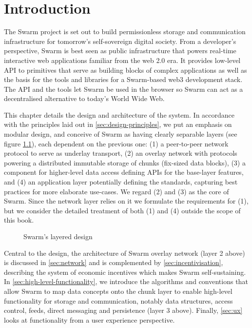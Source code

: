 \chapter{Introduction}

The Swarm project is set out to build permissionless storage and communication infrastructure for tomorrow's self-sovereign digital society.  From a developer's perspective, Swarm is best seen as public infrastructure that powers real-time interactive web applications familiar from the web 2.0 era. It provides low-level API to primitives that serve as building blocks of complex applications as well as the basis for the tools and libraries for a Swarm-based web3 development stack. The API and the tools let Swarm be used in the browser so Swarm can act as a decentralised alternative to today's World Wide Web.

This chapter details the design and architecture of the system. In accordance with the principles laid out in \ref{sec:design-principles}, we put an emphasis on modular design, and conceive of Swarm as having clearly separable layers (see figure \ref{fig:Swarm-layered-design}), each dependent on the previous one: (1) a peer-to-peer network protocol to serve as underlay transport, (2) an overlay network with protocols powering a distributed immutable storage of chunks (fix-sized data blocks),  (3) a component for higher-level data access defining APIs for the base-layer features, and (4) an application layer potentially defining the standards, capturing best practices for more elaborate use-cases. We regard (2) and (3) as the core of Swarm. Since the network layer relies on it we formulate the requirements for (1), but we consider the detailed treatment of both (1) and (4) outside the scope of this book.


\begin{figure}[htbp]
  \centering
  \caption[Swarm's layered design]{Swarm's layered design}
  \label{fig:Swarm-layered-design}
\end{figure}

Central to the design, the architecture of Swarm overlay network (layer 2 above) is discussed in \ref{sec:network} and is complemented by \ref{sec:incentivisation}, describing the system of economic incentives which makes Swarm self-sustaining. In \ref{sec:high-level-functionality}, we introduce the algorithms and conventions that allow Swarm to map data concepts onto the chunk layer to enable high-level functionality for storage and communication, notably data structures, access control, feeds, direct messaging and persistence (layer 3 above). Finally, \ref{sec:ux} looks at functionality from a user experience perspective.

